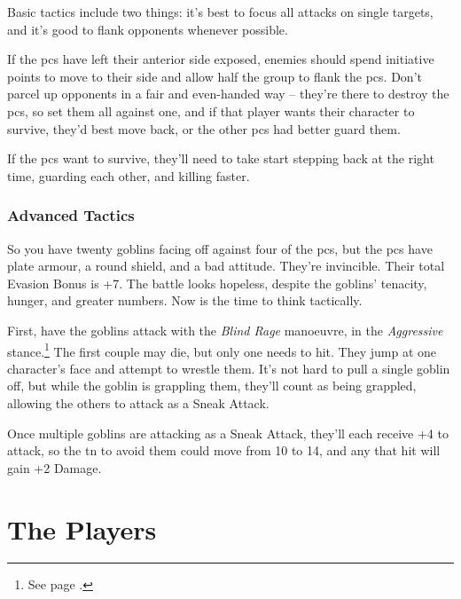 \begin{multicols}{2}
Basic tactics include two things: it's best to focus all attacks on single targets, and it's good to flank opponents whenever possible.

If the \glspl{pc} have left their anterior side exposed, enemies should spend initiative points to move to their side and allow half the group to flank the \glspl{pc}.
Don't parcel up opponents in a fair and even-handed way -- they're there to destroy the \glspl{pc}, so set them all against one, and if that player wants their character to survive, they'd best move back, or the other \glspl{pc} had better guard them.

If the \glspl{pc} want to survive, they'll need to take start stepping back at the right time, guarding each other, and killing faster.

\subsubsection{Advanced Tactics}

So you have twenty goblins facing off against four of the \glspl{pc}, but the \glspl{pc} have plate armour, a round shield, and a bad attitude.
They're invincible.
Their total Evasion Bonus is +7.
The battle looks hopeless, despite the goblins' tenacity, hunger, and greater numbers.
Now is the time to think tactically.

First, have the goblins attack with the \textit{Blind Rage} manoeuvre, in the \textit{Aggressive} stance.\footnote{See page \pageref{stances}.}
The first couple may die, but only one needs to hit.
They jump at one character's face and attempt to wrestle them.
It's not hard to pull a single goblin off, but while the goblin is grappling them, they'll count as being grappled, allowing the others to attack as a Sneak Attack.

Once multiple goblins are attacking as a Sneak Attack, they'll each receive +4 to attack, so the \gls{tn} to avoid them could move from 10 to 14, and any that hit will gain +2 Damage.

\end{multicols}

\section{The Players}

